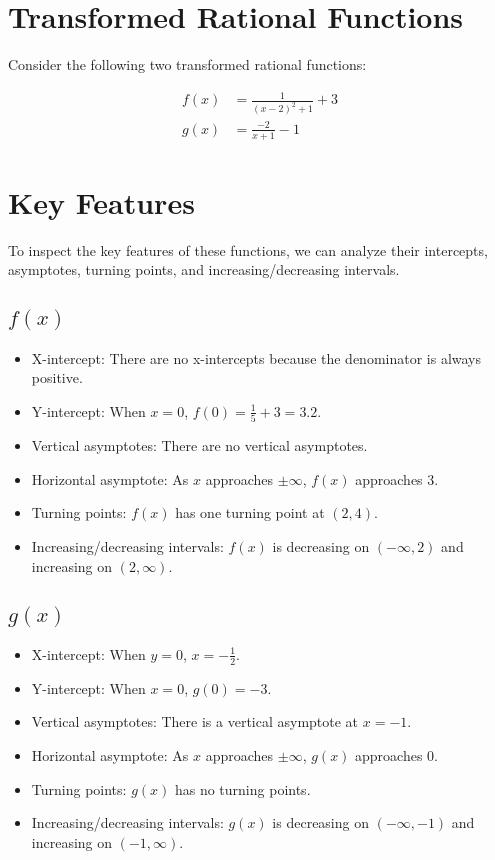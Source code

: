 \documentclass{article}
\begin{document}
\section{Transformed Rational Functions}

Consider the following two transformed rational functions:

\begin{align*}
f(x) &= \frac{1}{(x-2)^2+1}+3\\
g(x) &= \frac{-2}{x+1}-1
\end{align*}

\section{Key Features}

To inspect the key features of these functions, we can analyze their intercepts, asymptotes, turning points, and increasing/decreasing intervals.

\subsection{$f(x)$}

\begin{itemize}
\item X-intercept: There are no x-intercepts because the denominator is always positive.
\item Y-intercept: When $x=0$, $f(0)=\frac{1}{5}+3=3.2$.
\item Vertical asymptotes: There are no vertical asymptotes.
\item Horizontal asymptote: As $x$ approaches $\pm \infty$, $f(x)$ approaches $3$.
\item Turning points: $f(x)$ has one turning point at $(2,4)$.
\item Increasing/decreasing intervals: $f(x)$ is decreasing on $(-\infty,2)$ and increasing on $(2,\infty)$.
\end{itemize}

\subsection{$g(x)$}

\begin{itemize}
\item X-intercept: When $y=0$, $x=-\frac{1}{2}$.
\item Y-intercept: When $x=0$, $g(0)=-3$.
\item Vertical asymptotes: There is a vertical asymptote at $x=-1$.
\item Horizontal asymptote: As $x$ approaches $\pm \infty$, $g(x)$ approaches $0$.
\item Turning points: $g(x)$ has no turning points.
\item Increasing/decreasing intervals: $g(x)$ is decreasing on $(-\infty,-1)$ and increasing on $(-1,\infty)$.
\end{itemize}
\end{document}
